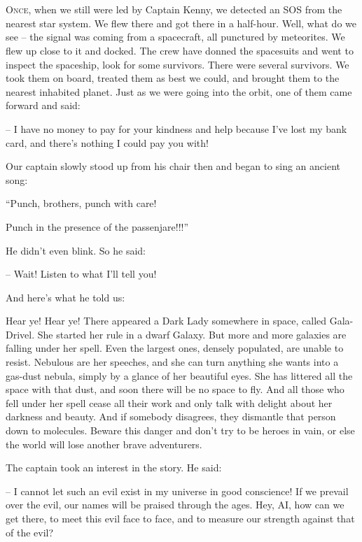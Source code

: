 \documentclass[ebook,oneside,final,openright]{memoir}
\begin{document}
\chapter{}
\par
\lettrine{O}{nce,} when we still were led by Captain Kenny, we detected an SOS from the nearest star system. We flew there and got there in a half-hour. Well, what do we see – the signal was coming from a spacecraft, all punctured by meteorites. We flew up close to it and docked. The crew have donned the spacesuits and went to inspect the spaceship, look for some survivors. There were several survivors. We took them on board, treated them as best we could, and brought them to the nearest inhabited planet. Just as we were going into the orbit, one of them came forward and said: \par
\par
– I have no money to pay for your kindness and help because I’ve lost my bank card, and there’s nothing I could pay you with!\par
Our captain slowly stood up from his chair then and began to sing an ancient song: \par
“Punch, brothers, punch with care! \par
 Punch in the presence of the passenjare!!!” \par
He didn’t even blink. So he said:\par
– Wait! Listen to what I’ll tell you! \par
 And here’s what he told us:\par
\par
Hear ye! Hear ye! There appeared a Dark Lady somewhere in space, called Gala-Drivel. She started her rule in a dwarf Galaxy. But more and more galaxies are falling under her spell. Even the largest ones, densely populated, are unable to resist. Nebulous are her speeches, and she can turn anything she wants into a gas-dust nebula, simply by a glance of her beautiful eyes. She has littered all the space with that dust, and soon there will be no space to fly. And all those who fell under her spell cease all their work and only talk with delight about her darkness and beauty. And if somebody disagrees, they dismantle that person down to molecules. Beware this danger and don’t try to be heroes in vain, or else the world will lose another brave adventurers.\par
\par
The captain took an interest in the story. He said:\par
– I cannot let such an evil exist in my universe in good conscience! If we prevail over the evil, our names will be praised through the ages. Hey, AI, how can we get there, to meet this evil face to face, and to measure our strength against that of the evil?\par
\end{document}
